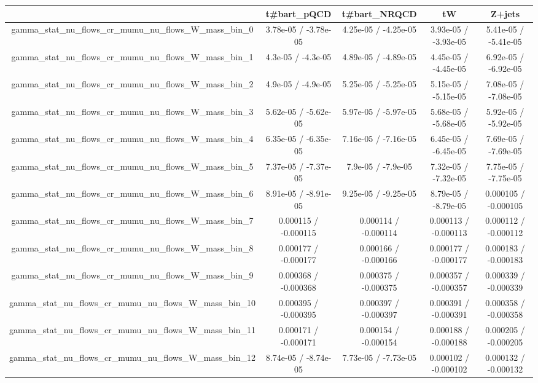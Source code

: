 \documentclass[10pt]{article}
\begin{document}
\begin{table}[htbp]
\begin{center}
\begin{tabular}{|c|c|c|c|c|}
\hline 
      & t#bar{t}_{pQCD}      & t#bar{t}_{NRQCD}      & tW      & Z+jets \\ 
\hline 
  gamma_stat_nu_flows_cr_mumu_nu_flows_W_mass_bin_0 & 3.78e-05 / -3.78e-05 & 4.25e-05 / -4.25e-05 & 3.93e-05 / -3.93e-05 & 5.41e-05 / -5.41e-05 \\ 
  gamma_stat_nu_flows_cr_mumu_nu_flows_W_mass_bin_1 & 4.3e-05 / -4.3e-05 & 4.89e-05 / -4.89e-05 & 4.45e-05 / -4.45e-05 & 6.92e-05 / -6.92e-05 \\ 
  gamma_stat_nu_flows_cr_mumu_nu_flows_W_mass_bin_2 & 4.9e-05 / -4.9e-05 & 5.25e-05 / -5.25e-05 & 5.15e-05 / -5.15e-05 & 7.08e-05 / -7.08e-05 \\ 
  gamma_stat_nu_flows_cr_mumu_nu_flows_W_mass_bin_3 & 5.62e-05 / -5.62e-05 & 5.97e-05 / -5.97e-05 & 5.68e-05 / -5.68e-05 & 5.92e-05 / -5.92e-05 \\ 
  gamma_stat_nu_flows_cr_mumu_nu_flows_W_mass_bin_4 & 6.35e-05 / -6.35e-05 & 7.16e-05 / -7.16e-05 & 6.45e-05 / -6.45e-05 & 7.69e-05 / -7.69e-05 \\ 
  gamma_stat_nu_flows_cr_mumu_nu_flows_W_mass_bin_5 & 7.37e-05 / -7.37e-05 & 7.9e-05 / -7.9e-05 & 7.32e-05 / -7.32e-05 & 7.75e-05 / -7.75e-05 \\ 
  gamma_stat_nu_flows_cr_mumu_nu_flows_W_mass_bin_6 & 8.91e-05 / -8.91e-05 & 9.25e-05 / -9.25e-05 & 8.79e-05 / -8.79e-05 & 0.000105 / -0.000105 \\ 
  gamma_stat_nu_flows_cr_mumu_nu_flows_W_mass_bin_7 & 0.000115 / -0.000115 & 0.000114 / -0.000114 & 0.000113 / -0.000113 & 0.000112 / -0.000112 \\ 
  gamma_stat_nu_flows_cr_mumu_nu_flows_W_mass_bin_8 & 0.000177 / -0.000177 & 0.000166 / -0.000166 & 0.000177 / -0.000177 & 0.000183 / -0.000183 \\ 
  gamma_stat_nu_flows_cr_mumu_nu_flows_W_mass_bin_9 & 0.000368 / -0.000368 & 0.000375 / -0.000375 & 0.000357 / -0.000357 & 0.000339 / -0.000339 \\ 
  gamma_stat_nu_flows_cr_mumu_nu_flows_W_mass_bin_10 & 0.000395 / -0.000395 & 0.000397 / -0.000397 & 0.000391 / -0.000391 & 0.000358 / -0.000358 \\ 
  gamma_stat_nu_flows_cr_mumu_nu_flows_W_mass_bin_11 & 0.000171 / -0.000171 & 0.000154 / -0.000154 & 0.000188 / -0.000188 & 0.000205 / -0.000205 \\ 
  gamma_stat_nu_flows_cr_mumu_nu_flows_W_mass_bin_12 & 8.74e-05 / -8.74e-05 & 7.73e-05 / -7.73e-05 & 0.000102 / -0.000102 & 0.000132 / -0.000132 \\ 

\end{tabular}
\end{center}
\end{table}
\end{document}
